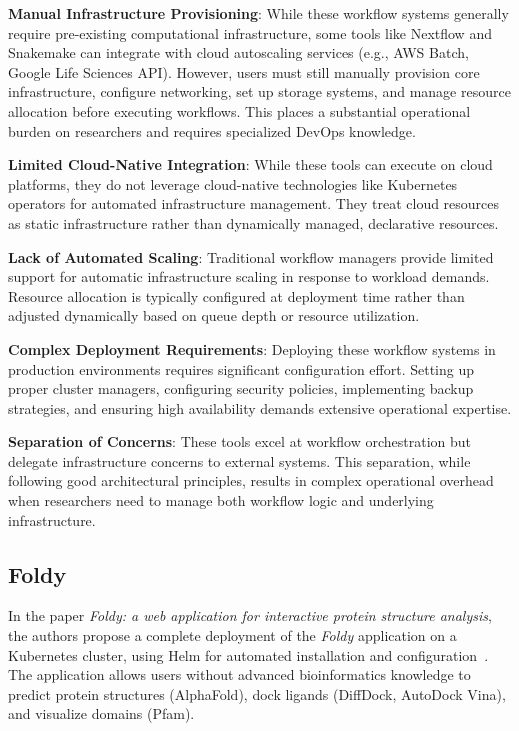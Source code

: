 \textbf{Manual Infrastructure Provisioning}: While these workflow systems generally require pre-existing computational infrastructure, some tools like Nextflow and Snakemake can integrate with cloud autoscaling services (e.g., AWS Batch, Google Life Sciences API).
However, users must still manually provision core infrastructure, configure networking, set up storage systems, and manage resource allocation before executing workflows.
This places a substantial operational burden on researchers and requires specialized DevOps knowledge.

\textbf{Limited Cloud-Native Integration}: While these tools can execute on cloud platforms, they do not leverage cloud-native technologies like Kubernetes operators for automated infrastructure management.
They treat cloud resources as static infrastructure rather than dynamically managed, declarative resources.

\textbf{Lack of Automated Scaling}: Traditional workflow managers provide limited support for automatic infrastructure scaling in response to workload demands.
Resource allocation is typically configured at deployment time rather than adjusted dynamically based on queue depth or resource utilization.

\textbf{Complex Deployment Requirements}: Deploying these workflow systems in production environments requires significant configuration effort.
Setting up proper cluster managers, configuring security policies, implementing backup strategies, and ensuring high availability demands extensive operational expertise.

\textbf{Separation of Concerns}: These tools excel at workflow orchestration but delegate infrastructure concerns to external systems.
This separation, while following good architectural principles, results in complex operational overhead when researchers need to manage both workflow logic and underlying infrastructure.

\subsection{Foldy}

In the paper \textit{Foldy: a web application for interactive protein structure analysis}, the authors propose a complete deployment of the \textit{Foldy} application on a Kubernetes cluster, using Helm for automated installation and configuration~\cite{foldy,helm}.
The application allows users without advanced bioinformatics knowledge to predict protein structures (AlphaFold), dock ligands (DiffDock, AutoDock Vina), and visualize domains (Pfam).

